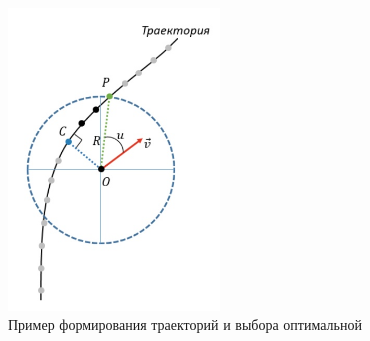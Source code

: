 \begin{figure}[h]
    \centering
    \includegraphics[width=0.5\textwidth]{images/path_moving}
    \caption{Пример формирования траекторий и выбора оптимальной}
    \label{img:path_moving}
\end{figure}





